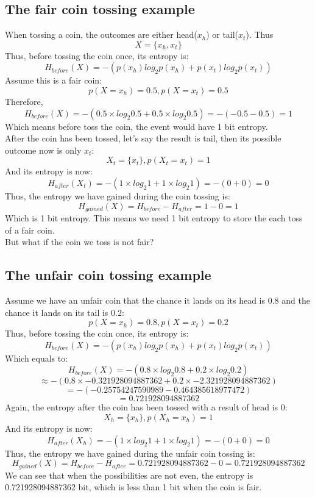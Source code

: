 \documentclass[12pt]{article}
\begin{document}
\subsection{The fair coin tossing example}
When tossing a coin, the outcomes are either head($x_h$) or tail($x_t$). Thus
\[
	X = \{x_h, x_t\}
\]
Thus, before tossing the coin once, its entropy is:
\[
	H_{before}(X) = -(p(x_h)log_{2}p(x_h) + p(x_t)log_{2}p(x_t))
\]
Assume this is a fair coin:
\[
	p(X=x_h) = 0.5, p(X=x_t) = 0.5
\]
Therefore,
\[
	H_{before}(X) = - (0.5 \times log_2 0.5 + 0.5 \times log_2 0.5)
		= -(-0.5-0.5) = 1
\]
Which means before toss the coin, the event would have 1 bit entropy.\\
After the coin has been tossed, let's say the result is tail, then its possible outcome now is only $x_t$:
\[
	X_t = \{x_t\} ,p(X_t=x_t) = 1
\] 
And its entropy is now:
\[
	H_{after}(X_t) = - (1 \times log_2 1 + 1 \times log_2 1)
		= - (0 + 0) = 0
\]
Thus, the entropy we have gained during the coin tossing is:
\[
	H_{gained}(X) = H_{before} - H_{after} = 1 - 0 = 1
\]
Which is 1 bit entropy. This means we need 1 bit entropy to store the each toss of a fair coin.\\
But what if the coin we toss is not fair?

\subsection{The unfair coin tossing example}
Assume we have an unfair coin that the chance it lands on its head is 0.8 and the chance it lands on its tail is 0.2:
\[
	p(X=x_h) = 0.8, p(X=x_t) = 0.2
\]
Thus, before tossing the coin once, its entropy is:
\[
	H_{before}(X) = -(p(x_h)log_{2}p(x_h) + p(x_t)log_{2}p(x_t))
\]
Which equals to:
\[
	H_{before}(X) = -(0.8 \times log_{2} 0.8 + 0.2 \times log_{2} 0.2)
\]
\[
		\approx -(0.8 \times -0.321928094887362 + 0.2 \times -2.321928094887362)
\]
\[
		= -(-0.25754247590989-0.464385618977472)
\]
\[
		= 0.721928094887362
\]
Again, the entropy after the coin has been tossed with a result of head is 0:
\[
	X_h = \{x_h\} ,p(X_h=x_h) = 1
\]
And its entropy is now:
\[
	H_{after}(X_h) = - (1 \times log_2 1 + 1 \times log_2 1)
		= - (0 + 0) = 0
\]
Thus, the entropy we have gained during the unfair coin tossing is:
\[
	H_{gained}(X) = H_{before} - H_{after} = 0.721928094887362 - 0 = 0.721928094887362
\]
We can see that when the possibilities are not even, the entropy is 0.721928094887362 bit, which is less than 1 bit when the coin is fair.\\
\end{document}
